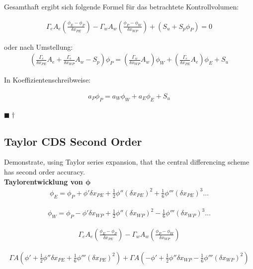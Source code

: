 \documentclass[a4paper]{scrartcl}
\newcommand{\qed}{\begin{flushright}
$\blacksquare \dagger$ \end{flushright}}
\begin{document}
Gesamthaft ergibt sich folgende Formel für das betrachtete Kontrollvolumen:

\begin{align}
\Gamma_e A_e \left(\frac{\phi_E-\phi_P}{\delta x_{PE}}\right)-\Gamma_w A_w
\left(\frac{\phi_P-\phi_W}{\delta x_{WP}}\right)+(S_u+S_p\phi_P)=0
\end{align}

oder nach Umstellung:
\begin{align}
\boxed{\left(\frac{\Gamma_e}{\delta x_{PE}}A_e + \frac{\Gamma_e}{\delta
x_{WP}} A_w -S_p\right)\phi_P=\left(\frac{\Gamma_w}{\delta x_{WP}}A_w\right)
\phi_W + \left(\frac{\Gamma_e}{\delta x_{PE}}A_e\right)\phi_E+S_u}
\end{align}

In Koeffizientenschreibweise:

\begin{align}
\boxed{a_P\phi_P=a_W\phi_W+a_E\phi_E+S_u}
\end{align}

\qed
\subsection{Taylor CDS Second Order}
Demonstrate, using Taylor series expansion, that the central differencing scheme
has second order accuracy.\\
\textbf{Taylorentwicklung von $\mathbf{\phi}$} \\

\begin{align}
\boxed{\phi_E=\phi_P+\phi'\delta x_{PE} + \frac{1}{2}\phi''\left(\delta
x_{PE}\right)^2+\frac{1}{6}\phi'''\left(\delta x_{PE}\right)^3\ldots}
\end{align}

\begin{align}
\boxed{\phi_W=\phi_P-\phi'\delta x_{WP} + \frac{1}{2}\phi''\left(\delta
x_{WP}\right)^2-\frac{1}{6}\phi'''\left(\delta x_{WP}\right)^3\ldots}
\end{align}

\begin{align}
\Gamma_e A_e \left(\frac{\phi_E-\phi_P}{\delta x_{PE}}\right)-\Gamma_w A_w
\left(\frac{\phi_P-\phi_W}{\delta x_{WP}}\right)
\end{align}

\begin{align}
\Gamma A \left(\phi' + \frac{1}{2} \phi''\delta
x_{PE}+\frac{1}{6}\phi'''\left(\delta x_{PE}\right)^2\right) + \Gamma A
\left(-\phi'+\frac{1}{2}\phi''\delta x_{WP} - \frac{1}{6} \phi'''
\left(\delta x_{WP}\right)^2\right)
\end{align}
\end{document}
